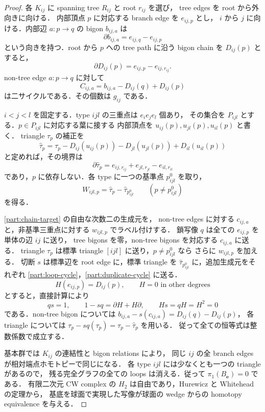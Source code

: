 \begin{proof}
各 $K_{ij}$ に spanning tree $R_{ij}$ と root $r_{ij}$ を選び，
tree edges を root から外向きに向ける．
内部頂点 $p$ に対応する branch edge を $e_{ij,p}$ とし，
$i$ から $j$ に向ける．内部辺 $a:p\to q$ の bigon $b_{ij,a}$ は
\[
 \partial b_{ij,a}=e_{ij,q}-e_{ij,p}
\]
という向きを持つ．root から $p$ への tree path に沿う bigon chain を $D_{ij}(p)$ とすると，
\[
 \partial D_{ij}(p)=e_{ij,p}-e_{ij,r_{ij}}.
\]
non-tree edge $a:p\to q$ に対して
\begin{equation}\label{part:loop-cycle}
 C_{ij,a}=b_{ij,a}-D_{ij}(q)+D_{ij}(p)
\end{equation}
は二サイクルである．その個数は $g_{ij}$ である．

$i<j<l$ を固定する．type $ijl$ の三重点は $e_ie_je_l$ 個あり，
その集合を $P_{ijl}$ とする．$p\in P_{ijl}$ に対応する葉に接する
内部頂点を $u_{ij}(p),u_{jl}(p),u_{il}(p)$ と書く．
triangle $\tau_p$ の補正を
\[
 \widehat\tau_p=\tau_p
 -D_{ij}(u_{ij}(p))-D_{jl}(u_{jl}(p))+D_{il}(u_{il}(p))
\]
と定めれば，その境界は
\[
 \partial\widehat\tau_p
 =e_{ij,r_{ij}}+e_{jl,r_{jl}}-e_{il,r_{il}}
\]
であり，$p$ に依存しない．各 type に一つの基準点 $p^0_{ijl}$ を取り，
\begin{equation}\label{part:duplicate-cycle}
 W_{ijl,p}=\widehat\tau_p-\widehat\tau_{p^0_{ijl}}
 \qquad(p\ne p^0_{ijl})
\end{equation}
を得る．

\eqref{part:chain-target} の自由な次数二の生成元を，
non-tree edges に対する $c_{ij,a}$ と，非基準三重点に対する $w_{ijl,p}$ でラベル付けする．
鎖写像 $q$ は全ての $e_{ij,p}$ を単体の辺 $ij$ に送り，
tree bigons を零，non-tree bigons を対応する $c_{ij,a}$ に送る．
triangle $\tau_p$ は標準 triangle $[ijl]$ に送り，$p\ne p^0_{ijl}$ なら
さらに $w_{ijl,p}$ を加える．
切断 $s$ は標準辺を root edge に，標準 triangle を
$\widehat\tau_{p^0_{ijl}}$ に，追加生成元をそれぞれ
\eqref{part:loop-cycle}，\eqref{part:duplicate-cycle} に送る．
\[
 H(e_{ij,p})=D_{ij}(p),\qquad H=0\text{ in other degrees}
\]
とすると，直接計算により
\[
 qs=1,\qquad 1-sq=\partial H+H\partial,
 \qquad Hs=qH=H^2=0
\]
である．non-tree bigon については
$b_{ij,a}-s(c_{ij,a})=D_{ij}(q)-D_{ij}(p)$，
各 triangle については $\tau_p-sq(\tau_p)=\tau_p-\widehat\tau_p$ を用いる．
従って全ての恒等式は整数係数で成立する．

基本群では $K_{ij}$ の連結性と bigon relations により，
同じ $ij$ の全 branch edges が相対端点ホモトピーで同じになる．
各 type $ijl$ には少なくとも一つの triangle があるので，
残る完全グラフの全ての loops は消える．従って $\pi_1(B_{\boldsymbol e})=0$ である．
有限二次元 CW complex の $H_2$ は自由であり，Hurewicz と Whitehead の定理から，
基底を球面で実現した写像が球面の wedge からの homotopy equivalence を与える．


\end{proof}
